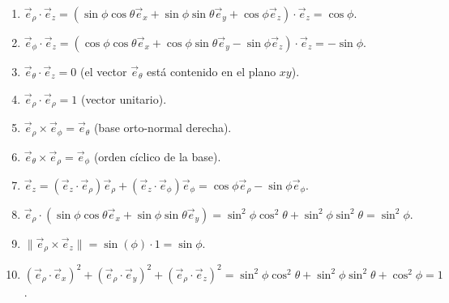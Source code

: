 \begin{sol}
    

\begin{enumerate}
    \item $\vec{e}_\rho \cdot \vec{e}_z = (\sin\phi\cos\theta\vec{e}_x + \sin\phi\sin\theta\vec{e}_y + \cos\phi\vec{e}_z) \cdot \vec{e}_z = \cos\phi$.
    \item $\vec{e}_\phi \cdot \vec{e}_z = (\cos\phi\cos\theta\vec{e}_x + \cos\phi\sin\theta\vec{e}_y - \sin\phi\vec{e}_z) \cdot \vec{e}_z = -\sin\phi$.
    \item $\vec{e}_\theta \cdot \vec{e}_z = 0$ (el vector $\vec{e}_\theta$ está contenido en el plano $xy$).
    \item $\vec{e}_\rho \cdot \vec{e}_\rho = 1$ (vector unitario).
    \item $\vec{e}_\rho \times \vec{e}_\phi = \vec{e}_\theta$ (base orto-normal derecha).
    \item $\vec{e}_\theta \times \vec{e}_\rho = \vec{e}_\phi$ (orden cíclico de la base).
    \item $\vec{e}_z = (\vec{e}_z \cdot \vec{e}_\rho)\vec{e}_\rho + (\vec{e}_z \cdot \vec{e}_\phi)\vec{e}_\phi = \cos\phi\vec{e}_\rho - \sin\phi\vec{e}_\phi$.
    \item $\vec{e}_\rho \cdot (\sin\phi\cos\theta\vec{e}_x + \sin\phi\sin\theta\vec{e}_y) = \sin^2\phi\cos^2\theta + \sin^2\phi\sin^2\theta = \sin^2\phi$.
    \item $\| \vec{e}_\rho \times \vec{e}_z \| = \sin(\phi) \cdot 1 = \sin\phi$.
    \item $(\vec{e}_\rho \cdot \vec{e}_x)^2 + (\vec{e}_\rho \cdot \vec{e}_y)^2 + (\vec{e}_\rho \cdot \vec{e}_z)^2 = \sin^2\phi\cos^2\theta + \sin^2\phi\sin^2\theta + \cos^2\phi = 1$.
\end{enumerate}
\end{sol}
